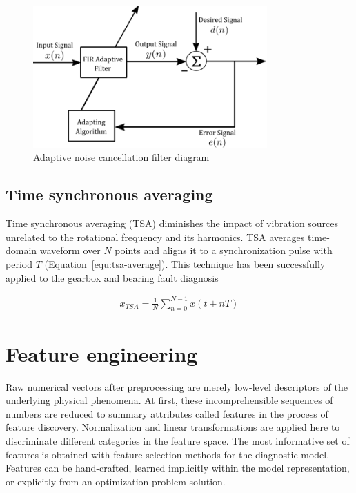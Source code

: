 \begin{figure}[h]
	\centering
	\includegraphics[width=0.8\textwidth]{assets/adaptive-filter.png}
	\caption{Adaptive noise cancellation filter diagram}
	\label{fig:adaptive-filter}
\end{figure}
\bigbreak

\subsection{Time synchronous averaging}
Time synchronous averaging (TSA) diminishes the impact of vibration sources unrelated to the rotational frequency and its harmonics. TSA averages time-domain waveform over $N$ points and aligns it to a synchronization pulse with period $T$ (Equation~\ref{equ:tsa-average}). This technique has been successfully applied to the gearbox and bearing fault diagnosis~\cite{davies_handbook_2012,nandi_condition_2019}

\begin{ceqn}\begin{align}
x_{TSA} = \frac{1}{N} \sum_{n = 0}^{N - 1}{x(t + nT)}
\label{equ:tsa-average}
\end{align}\end{ceqn}


\section{Feature engineering} \label{section:feature-engineering}
Raw numerical vectors after preprocessing are merely low-level descriptors of the underlying physical phenomena. At first, these incomprehensible sequences of numbers are reduced to summary attributes called features in the process of feature discovery. Normalization and linear transformations are applied here to discriminate different categories in the feature space. The most informative set of features is obtained with feature selection methods for the diagnostic model. Features can be hand-crafted, learned implicitly within the model representation, or explicitly from an optimization problem solution.  

